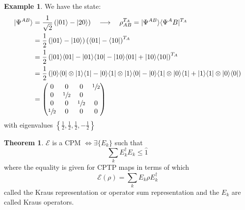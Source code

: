 \documentclass[12pt]{book}
\theoremstyle{definition}
\newtheorem*{theo}{\bfseries Theorem}
\newtheorem*{expl}{\bfseries Example}
\let\oldsum\sum
\renewcommand{\sum}[2]{\oldsum\limits_{#1}^{#2}}
\renewcommand{\to}{\longrightarrow}
\newcommand{\para}[1]{\left( {#1} \right)}
\newcommand{\bra}[1]{\langle {#1} \vert}
\newcommand{\ket}[1]{\vert {#1} \rangle}
\begin{document}
\begin{expl}
We have the state:
\begin{align*}
  \ket{\Psi^{AB}} & = \frac{1}{\sqrt{2}} \para{\ket{01} - \ket{20}} \quad\to\quad \rho_{AB}^{T_A} = \ket{\Psi^{AB}} \bra{\Psi^AB}^{T_A} \\
  & = \frac{1}{2} \para{\ket{01} - \ket{10}}\para{\bra{01} - \bra{10}}^{T_A} \\
  & = \frac{1}{2} \para{\ket{01}\bra{01} - \ket{01}\bra{10} - \ket{10}\bra{01} + \ket{10}\bra{10}}^{T_A} \\
  & = \frac{1}{2} \para{\ket{0}\bra{0} \otimes \ket{1}\bra{1} - \ket{0}\bra{1} \otimes \ket{1} \bra{0} - \ket{0} \bra{1} \otimes \ket{0} \bra{1} + \ket{1}\bra{1} \otimes\ket{0} \bra{0}} \\
  & =
  \begin{pmatrix}
    0 & 0 & 0 & \sfrac{1}{2} \\
    0 & \sfrac{1}{2} & 0 & \\
    0 & 0 & \sfrac{1}{2} & 0 \\
    \sfrac{1}{2} & 0 & 0 & 0
  \end{pmatrix}
\end{align*}
with eigenvalues $\left\{\frac{1}{2}, \frac{1}{2}, \frac{1}{2}, -\frac{1}{2}\right\}$
\end{expl}


\begin{theo}
    $\mathcal E$ is a CPM $\iff \exists \{E_k\}$ such that
    \begin{equation}
      \oldsum_k E_k^\dagger E_k \leq \hat 1
    \end{equation}
    where the equality is given for CPTP maps in terms of which
    \begin{equation}
      \mathcal E(\rho) = \oldsum_k E_k \rho E_k^\dagger
    \end{equation}
    called the Kraus representation or operator sum representation and the $E_k$ are called Kraus operators.
\end{theo}
\end{document}
